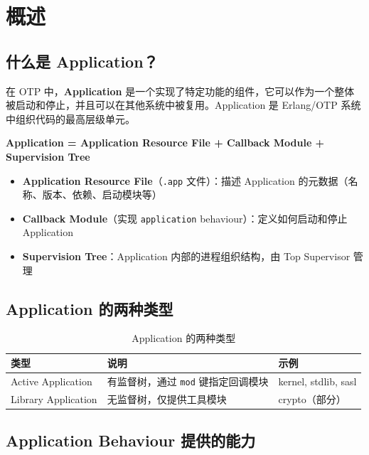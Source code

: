 \documentclass[a4paper,11pt]{article}
\begin{document}
\section{概述}

\subsection{什么是 Application？}

在 OTP 中，\textbf{Application} 是一个实现了特定功能的组件，它可以作为一个整体被启动和停止，并且可以在其他系统中被复用。Application 是 Erlang/OTP 系统中组织代码的最高层级单元。

\begin{tipbox}[核心思想]
\textbf{Application = Application Resource File + Callback Module + Supervision Tree}

\begin{itemize}[leftmargin=1.5em]
    \item \textbf{Application Resource File}（\texttt{.app} 文件）：描述 Application 的元数据（名称、版本、依赖、启动模块等）
    \item \textbf{Callback Module}（实现 \texttt{application} behaviour）：定义如何启动和停止 Application
    \item \textbf{Supervision Tree}：Application 内部的进程组织结构，由 Top Supervisor 管理
\end{itemize}
\end{tipbox}

\subsection{Application 的两种类型}

\begin{table}[H]
\centering
\begin{tabular}{@{}lll@{}}
\toprule
\textbf{类型} & \textbf{说明} & \textbf{示例} \\
\midrule
Active Application  & 有监督树，通过 \texttt{mod} 键指定回调模块 & kernel, stdlib, sasl \\
Library Application & 无监督树，仅提供工具模块 & crypto（部分） \\
\bottomrule
\end{tabular}
\caption{Application 的两种类型}
\end{table}

\subsection{Application Behaviour 提供的能力}
\end{document}
